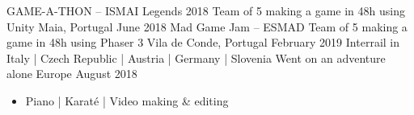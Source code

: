\documentclass[]{awesome-cv}
\begin{document}
\vspace{-2mm}
\begin{cvhonors}
	\cvhonor
	{GAME-A-THON – ISMAI Legends 2018}
	{Team of 5 making a game in 48h using Unity}
	{Maia, Portugal}
	{June 2018}
	\cvhonor
	{Mad Game Jam – ESMAD}
	{Team of 5 making a game in 48h using Phaser 3}
	{Vila de Conde, Portugal}
	{February 2019}
	\cvhonor
	{Interrail in Italy | Czech Republic | Austria | Germany | Slovenia}
	{Went on an adventure alone}
	{Europe}
	{August 2018}
\end{cvhonors}

\begin{itemize}
	\item {Piano | Karaté | Video making \& editing} 
\end{itemize}
\end{document}
